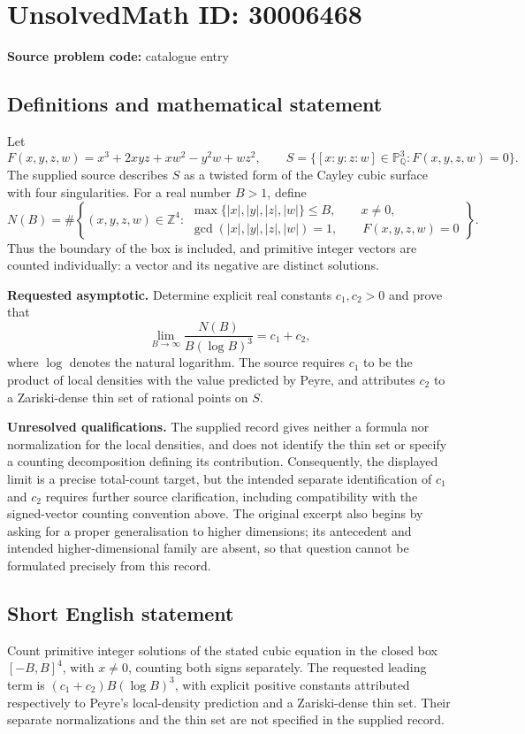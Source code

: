 \documentclass[11pt]{article}
\newcommand{\Z}{\mathbb{Z}}
\newcommand{\Q}{\mathbb{Q}}
\newcommand{\PP}{\mathbb{P}}
\begin{document}
\section*{UnsolvedMath ID: 30006468}
\textbf{Source problem code:} catalogue entry
\subsection{Definitions and mathematical statement}
Let
\[
F(x,y,z,w)=x^3+2xyz+xw^2-y^2w+wz^2,
\qquad
S=\{[x:y:z:w]\in\PP^3_{\Q}:F(x,y,z,w)=0\}.
\]
The supplied source describes \(S\) as a twisted form of the Cayley cubic surface with four singularities. For a real number \(B>1\), define
\[
N(B)=\#\left\{(x,y,z,w)\in\Z^4:
\begin{gathered}
\max\{|x|,|y|,|z|,|w|\}\le B,\qquad x\ne0,\\
\gcd(|x|,|y|,|z|,|w|)=1,\qquad F(x,y,z,w)=0
\end{gathered}
\right\}.
\]
Thus the boundary of the box is included, and primitive integer vectors are counted individually: a vector and its negative are distinct solutions.

\textbf{Requested asymptotic.} Determine explicit real constants \(c_1,c_2>0\) and prove that
\[
\lim_{B\to\infty}\frac{N(B)}{B(\log B)^3}=c_1+c_2,
\]
where \(\log\) denotes the natural logarithm. The source requires \(c_1\) to be the product of local densities with the value predicted by Peyre, and attributes \(c_2\) to a Zariski-dense thin set of rational points on \(S\).

\textbf{Unresolved qualifications.} The supplied record gives neither a formula nor normalization for the local densities, and does not identify the thin set or specify a counting decomposition defining its contribution. Consequently, the displayed limit is a precise total-count target, but the intended separate identification of \(c_1\) and \(c_2\) requires further source clarification, including compatibility with the signed-vector counting convention above. The original excerpt also begins by asking for a proper generalisation to higher dimensions; its antecedent and intended higher-dimensional family are absent, so that question cannot be formulated precisely from this record.
\subsection{Short English statement}
Count primitive integer solutions of the stated cubic equation in the closed box \([-B,B]^4\), with \(x\ne0\), counting both signs separately. The requested leading term is \((c_1+c_2)B(\log B)^3\), with explicit positive constants attributed respectively to Peyre's local-density prediction and a Zariski-dense thin set. Their separate normalizations and the thin set are not specified in the supplied record.
\end{document}
